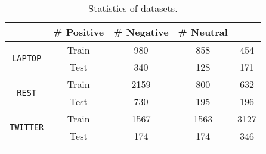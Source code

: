 \documentclass[11pt,a4paper]{article}
\begin{document}
\begin{table}[t!]
\centering
\resizebox{0.48\textwidth}{!}
{\begin{tabular}{ccccc}
\Xhline{3\arrayrulewidth}
 \multicolumn{2}{c}{} & \# Positive & \# Negative & \# Neutral \\ \hline
\multirow{2}{*}{\texttt{LAPTOP}} & Train & 980 & 858 & 454 \\ & Test & 340 & 128 & 171 \\ \hline
\multirow{2}{*}{\texttt{REST}} & Train & 2159 & 800 & 632\\ & Test & 730 & 195 & 196\\ \hline
\multirow{2}{*}{\texttt{TWITTER}} & Train & 1567 & 1563 & 3127\\ & Test & 174 & 174 & 346 \\ \Xhline{3\arrayrulewidth}
\end{tabular}}
\caption{Statistics of datasets.}
\label{tab:statistics}
\end{table}
\end{document}
